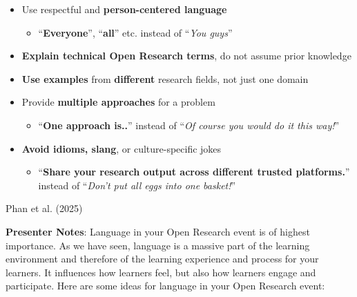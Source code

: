 \documentclass[
  letterpaper,
  DIV=11,
  numbers=noendperiod]{scrartcl}
\providecommand{\tightlist}{%
  \setlength{\itemsep}{0pt}\setlength{\parskip}{0pt}}
\begin{document}
\begin{itemize}
\item
  Use respectful and \textbf{person-centered language}

  \begin{itemize}
  \tightlist
  \item
    ``\textbf{Everyone}'', ``\textbf{all}'' etc. instead of ``\emph{You
    guys}''
  \end{itemize}
\item
  \textbf{Explain technical Open Research terms}, do not assume prior
  knowledge
\item
  \textbf{Use examples} from \textbf{different} research fields, not
  just one domain
\item
  Provide \textbf{multiple approaches} for a problem

  \begin{itemize}
  \tightlist
  \item
    ``\textbf{One approach is..}'' instead of ``\emph{Of course you
    would do it this way!}''
  \end{itemize}
\item
  \textbf{Avoid idioms, slang}, or culture-specific jokes

  \begin{itemize}
  \tightlist
  \item
    ``\textbf{Share your research output across different trusted
    platforms.}'' instead of ``\emph{Don't put all eggs into one
    basket!}''
  \end{itemize}
\end{itemize}

Phan et al. (2025)

\textbf{Presenter Notes}: Language in your Open Research event is of
highest importance. As we have seen, language is a massive part of the
learning environment and therefore of the learning experience and
process for your learners. It influences how learners feel, but also how
learners engage and participate. Here are some ideas for language in
your Open Research event:
\end{document}
